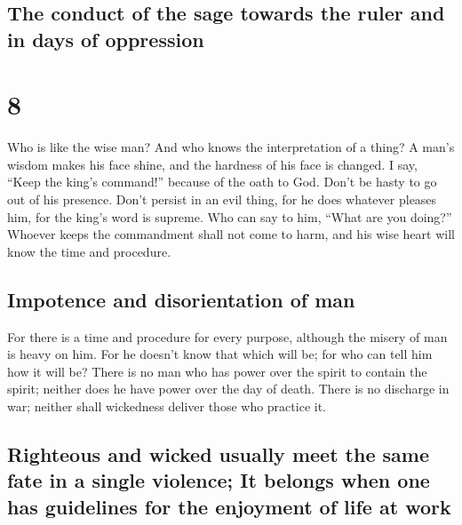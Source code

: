 \hypertarget{the-conduct-of-the-sage-towards-the-ruler-and-in-days-of-oppression}{%
\subsection{The conduct of the sage towards the ruler and in days of
oppression}\label{the-conduct-of-the-sage-towards-the-ruler-and-in-days-of-oppression}}

\hypertarget{section-7}{%
\section{8}\label{section-7}}

 Who is like the wise man? And who knows the
interpretation of a thing? A man's wisdom makes his face shine, and the
hardness of his face is changed.  I say, ``Keep the king's
command!'' because of the oath to God.  Don't be hasty to
go out of his presence. Don't persist in an evil thing, for he does
whatever pleases him,  for the king's word is supreme. Who
can say to him, ``What are you doing?''  Whoever keeps the
commandment shall not come to harm, and his wise heart will know the
time and procedure.

\hypertarget{impotence-and-disorientation-of-man}{%
\subsection{Impotence and disorientation of
man}\label{impotence-and-disorientation-of-man}}

 For there is a time and procedure for every purpose,
although the misery of man is heavy on him.  For he
doesn't know that which will be; for who can tell him how it will be?
 There is no man who has power over the spirit to contain
the spirit; neither does he have power over the day of death. There is
no discharge in war; neither shall wickedness deliver those who practice
it.

\hypertarget{righteous-and-wicked-usually-meet-the-same-fate-in-a-single-violence-it-belongs-when-one-has-guidelines-for-the-enjoyment-of-life-at-work}{%
\subsection{Righteous and wicked usually meet the same fate in a single
violence; It belongs when one has guidelines for the enjoyment of life
at
work}\label{righteous-and-wicked-usually-meet-the-same-fate-in-a-single-violence-it-belongs-when-one-has-guidelines-for-the-enjoyment-of-life-at-work}}

